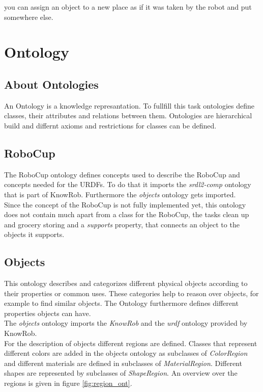 \documentclass[main.tex]{subfiles}
\begin{document}
you can assign an object to a new place as if it was taken by the robot and put somewhere else.

\section{Ontology}
\subsection{About Ontologies}
An Ontology is a knowledge represantation. To fullfill this task ontologies define classes, their attributes and relations between them. Ontologies are hierarchical build and differnt axioms and restrictions for classes can be defined.


\subsection{RoboCup}
The RoboCup ontology defines concepts used to describe the RoboCup and concepts needed for the URDFs. To do that it imports the \textit{srdl2-comp} ontology that is part of KnowRob. Furthermore the \textit{objects} ontology gets imported.\\
Since the concept of the RoboCup is not fully implemented yet, this ontology does not contain much apart from a class for the RoboCup, the tasks clean up and grocery storing and a \textit{supports} property, that connects an object to the objects it supports.

\subsection{Objects}

This ontology describes and categorizes different physical objects according to their properties or common uses. These categories help to reason over objects, for example to find similar objects. The Ontology furthermore defines different properties objects can have. \\
The \textit{objects} ontology imports the \textit{KnowRob} and the \textit{urdf} ontology provided by KnowRob.\\
For the description of objects different regions are defined. Classes that represent different colors are added in the objects ontology as subclasses of \textit{ColorRegion} and different materials are defined in subclasses of \textit{MaterialRegion}. Different shapes are represented by subclasses of \textit{ShapeRegion}. An overview over the regions is given in figure \ref{fig:region_ont}.
\end{document}
